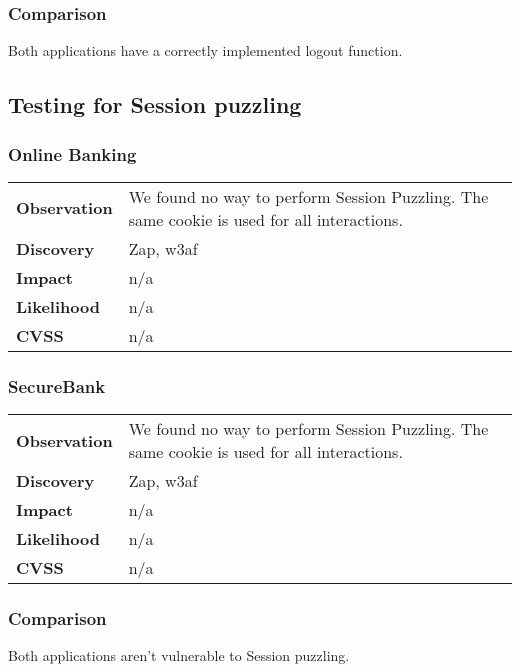 \subsubsection*{Comparison}
Both applications have a correctly implemented logout function.

\clearpage


\subsection{Testing for Session puzzling}

\subsubsection*{Online Banking}

\begin{tabular}{l|p{10cm}}
\textbf{Observation} & We found no way to perform Session Puzzling. The same cookie is used for all interactions. \\
\textbf{Discovery} & Zap, w3af \\
\textbf{Impact} & n/a \\
\textbf{Likelihood} & n/a \\
\textbf{CVSS} & n/a \\
\end{tabular}

\subsubsection*{SecureBank}

\begin{tabular}{l|p{10cm}}
\textbf{Observation} & We found no way to perform Session Puzzling. The same cookie is used for all interactions. \\
\textbf{Discovery} & Zap, w3af \\
\textbf{Impact} & n/a \\
\textbf{Likelihood} & n/a \\
\textbf{CVSS} & n/a \\
\end{tabular}

\subsubsection*{Comparison}
Both applications aren't vulnerable to Session puzzling.

\clearpage










